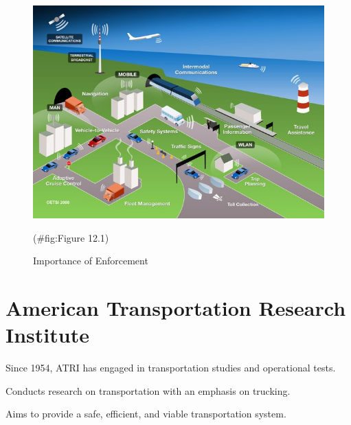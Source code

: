 \documentclass[
]{book}
\begin{document}
\begin{figure}

{\centering \includegraphics{./Images/Research organizations/Importance of Enforcement} 

}

\caption{Importance of Enforcement}(\#fig:Figure 12.1)
\end{figure}

\hypertarget{organization-ATRIOrganization}{%
\section{American Transportation Research Institute}\label{organization-ATRIOrganization}}

Since 1954, ATRI has engaged in transportation studies and operational tests.

Conducts research on transportation with an emphasis on trucking.

Aims to provide a safe, efficient, and viable transportation system.
\end{document}
